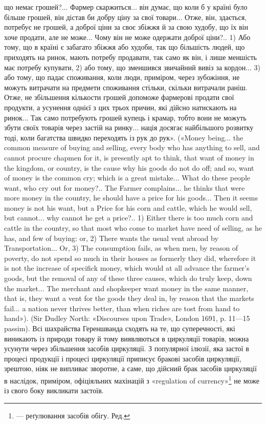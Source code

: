 що немає грошей?... Фармер скаржиться... він думає, що коли б у країні
було більше грошей, він дістав би добру ціну за свої товари... Отже, він,
здається, потребує не грошей, а доброї ціни за своє збіжжя й за свою худобу,
що їх він хоче продати, але не може... Чому він не може одержати
доброї ціни?.. 1) Або тому, що в країні є забагато збіжжя або худоби,
так що більшість людей, що приходять на ринок, мають потребу продавати,
так само як він, і лише меншість має потребу купувати, 2) або
тому, що зменшився звичайний вивіз за кордон... 3) або тому, що падає
споживання, коли люди, приміром, через зубожіння, не можуть витрачати
на предмети споживання стільки, скільки витрачали раніш. Отже,
не збільшення кількости грошей допоможе фармерові продати свої продукти,
а усунення однієї з цих трьох причин, які дійсно натискають на
ринок... Так само потребують грошей купець і крамар, тобто вони не можуть
збути своїх товарів через застій на ринку... нація досягає найбільшого
розвитку тоді, коли багатства швидко переходять із рук до рук».
(«Money being... the common measure of buying and selling, every body
who has anything to sell, and cannot procure chapmen for it, is presently
apt to think, that want of money in the kingdom, or country, is the cause
why his goods do not do off; and so, want of money is the common cry;
which is a great mistake... What do these people want, who cry out for
money?.. The Farmer complains... he thinks that were more money in the
country, he should have a price for his goods... Then it seems money is not
his want, but a Price for his corn and cattle, which he would sell, but cannot...
why cannot he get a price?.. 1) Either there is too much corn and cattle
in the country, so that most who come to market have need of selling,
as he has, and few of buying: or, 2) There wants the usual vent abroad by
Transportation... Or, 3) The consumption fails, as when men, by reason of
poverty, do not spend so much in their houses as formerly they did, wherefore
it is not the increase of specifick money, which would at all advance
the farmer’s goods, but the removal of any of these three causes, which
do truly keep, down the market... The merchant and shopkeeper want money
in the same manner, that is, they want a vent for the goods they deal in,
by reason that the markets fail... a nation never thrives better, than when
riches are tost from hand to hand»). (Sir Dudley North: «Discourses upon
Trade», London 1691, p. 11—15 passim). Всі шахрайства Гереншванда
сходять на те, що суперечності, які виникають із природи товару й тому
виявляються в циркуляції товарів, можна усунути через збільшення
засобів циркуляції. З популярної ілюзії, яка застої в процесі продукції
і процесі циркуляції приписує бракові засобів циркуляції, зрештою,
ніяк не випливає зворотне, а саме, що дійсний брак засобів циркуляції
в наслідок, приміром, офіціяльних махінацій з «regulation of
currency»\footnote*{
— реґулювання засобів обігу. Ред.
} не може із свого боку викликати застоїв.
